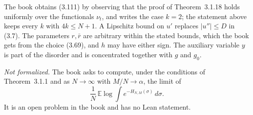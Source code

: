 \begin{remark}\label{rem:sg-tal:st-eq-3111}
The book obtains (3.111) by observing that the proof of Theorem~3.1.18 holds uniformly over the functionals
$\nu_t$, and writes the case $k=2$; the statement above keeps every $k$ with $4k\le N+1$. A Lipschitz bound on
$u'$ replaces $|u''|\le D$ in (3.7). The parameters $r,\bar r$ are arbitrary within the stated bounds, which the
book gets from the choice (3.69), and $h$ may have either sign. The auxiliary variable $y$ is part of the
disorder and is concentrated together with $g$ and $g_0$.
\end{remark}

\begin{remark}\label{rem:sg-tal:st-problem-312}
\emph{Not formalized.} The book asks to compute, under the conditions of Theorem~3.1.1 and as
$N\to\infty$ with $M/N\to\alpha$, the limit of
\[
\frac1N\,\mathbb E\log\int e^{-H_{N,M}(\sigma)}\,d\sigma .
\]
It is an open problem in the book and has no Lean statement.
\end{remark}

